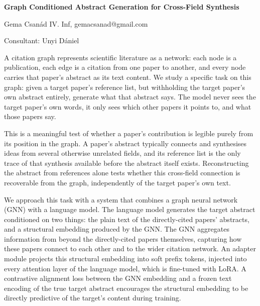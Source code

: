 \documentclass[12pt]{article}
\begin{document}
\begin{center}
    {\Large\bfseries Graph Conditioned Abstract Generation for Cross-Field Synthesis}
\end{center}

\vspace{0.8em}

\begin{center}
    Gema Csanád IV. Inf, gemacsanad@gmail.com \\
    
\end{center}

\vspace{0.4em}

\begin{center}
    Consultant: Unyi Dániel 
\end{center}

\vspace{1.2em}


A citation graph represents scientific literature as a network: each
node is a publication, each edge is a citation from one paper to
another, and every node carries that paper's abstract as its text
content. We study a specific task on this graph: given a target
paper's reference list, but withholding the target paper's own abstract
entirely, generate what that abstract says. The model never sees the
target paper's own words, it only sees which other papers it points
to, and what those papers say.

This is a meaningful test of whether a paper's contribution is
legible purely from its position in the graph. A paper's abstract
typically connects and synthesises ideas from several otherwise
unrelated fields, and its reference list is the only trace of
that synthesis available before the abstract itself exists.
Reconstructing the abstract from references alone tests whether this
cross-field connection is recoverable from the graph, independently
of the target paper's own text.

We approach this task with a system that combines a graph neural
network (GNN) with a language model. The language model generates the
target abstract conditioned on two things: the plain text of the
directly-cited papers' abstracts, and a structural embedding produced
by the GNN. The GNN aggregates information from beyond the
directly-cited papers themselves, capturing how these papers connect
to each other and to the wider citation network. An adapter
module projects this structural embedding into soft prefix tokens,
injected into every attention layer of the language model, which is
fine-tuned with LoRA. A contrastive alignment loss between the GNN
embedding and a frozen text encoding of the true target abstract
encourages the structural embedding to be directly predictive of the
target's content during training.
\end{document}
